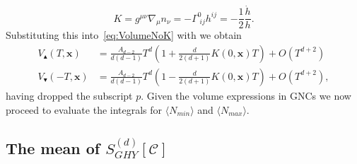 \documentclass[12pt]{article}
\newcommand{\be}{\begin{equation}}
\newcommand{\ee}{\end{equation}}
\begin{document}
\be\label{eq:K}
K
=g^{\mu\nu }\nabla_{\mu}n_{\nu}
=-\Gamma^{0}_{\;ij}h^{ij}=-\frac{1}{2}\frac{\dot{h}}{h}.
\ee
Substituting this into~\eqref{eq:VolumeNoK} with we obtain 
\begin{align}
V_\blacktriangle(T,\mathbf x)
&=\frac{A_{d-2}}{d(d-1)}T^d\left(1+\frac{d}{2(d+1)}K(0,\mathbf{x})T\right)
+O(T^{d+2}) \label{eq:TopVolumeWithK}\\
V_\blacktriangledown(-T,\mathbf x)
&=\frac{A_{d-2}}{d(d-1)}T^d\left(1-\frac{d}{2(d+1)}K(0,\mathbf{x})T\right)
+O(T^{d+2}), \label{eq:BottomVolumeWithK}
\end{align}
having dropped the subscript $p$. Given the volume expressions in GNCs we now proceed to evaluate the integrals for $\langle N_{min}\rangle $ and $\langle N_{max}\rangle$.

\subsection{The mean of $S^{(d)}_{GHY}[\mathcal C]$}
\end{document}
